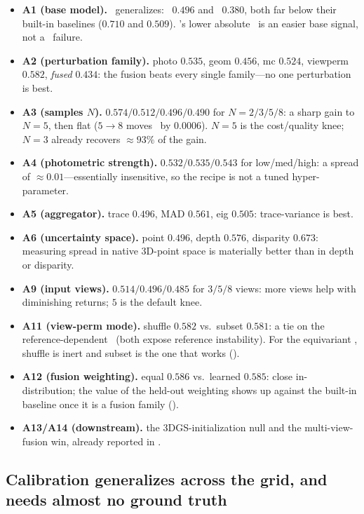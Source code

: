 \begin{itemize}[leftmargin=1.4em,itemsep=2pt,topsep=2pt]
\item \textbf{A1 (base model).} \trustr\ generalizes: \vggt\ $0.496$ and \pii\ $0.380$, both far below
their built-in baselines ($0.710$ and $0.509$). \pii's lower absolute \ause\ is an easier base signal,
not a \vggt\ failure.
\item \textbf{A2 (perturbation family).} photo $0.535$, geom $0.456$, mc $0.524$, viewperm $0.582$,
\emph{fused} $0.434$: the fusion beats every single family---no one perturbation is best.
\item \textbf{A3 (samples $N$).} $0.574/0.512/0.496/0.490$ for $N{=}2/3/5/8$: a sharp gain to $N{=}5$,
then flat ($5\to8$ moves \ause\ by $0.0006$). $N{=}5$ is the cost/quality knee; $N{=}3$ already
recovers $\approx 93\%$ of the gain.
\item \textbf{A4 (photometric strength).} $0.532/0.535/0.543$ for low/med/high: a spread of $\approx
0.01$---essentially insensitive, so the recipe is not a tuned hyper-parameter.
\item \textbf{A5 (aggregator).} trace $0.496$, MAD $0.561$, eig $0.505$: trace-variance is best.
\item \textbf{A6 (uncertainty space).} point $0.496$, depth $0.576$, disparity $0.673$: measuring
spread in native 3D-point space is materially better than in depth or disparity.
\item \textbf{A9 (input views).} $0.514/0.496/0.485$ for $3/5/8$ views: more views help with
diminishing returns; $5$ is the default knee.
\item \textbf{A11 (view-perm mode).} shuffle $0.582$ vs.\ subset $0.581$: a tie on the
reference-dependent \vggt\ (both expose reference instability). For the equivariant \pii, shuffle is
inert and subset is the one that works ().
\item \textbf{A12 (fusion weighting).} equal $0.586$ vs.\ learned $0.585$: close in-distribution; the
value of the held-out weighting shows up against the built-in baseline once it is a fusion family
().
\item \textbf{A13/A14 (downstream).} the 3DGS-initialization null and the multi-view-fusion win,
already reported in .
\end{itemize}

\subsection{Calibration generalizes across the grid, and needs almost no ground truth}
\label{sec:abl-calib}

